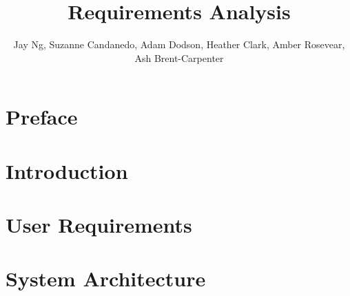 \documentclass[]{IEEEtran}
\title{Requirements Analysis}
\author{Jay Ng, Suzanne Candanedo, Adam Dodson, Heather Clark, Amber Rosevear, Ash Brent-Carpenter}
\begin{document}
	\maketitle
	
	\begin{comment}
		Each team is required to provide a Requirements Analysis Report. This will document your teams understanding of the specification, and will raise any questions that you may have. As well as addressing the specification itself, the report should also document any decisions that have been made in terms of group management (i.e. how you have organized yourselves to meet the goals of this project, how often you will meet, how you will address decision making etc.) and what methods you intend using in the planning and design of your solution.
		
		The requirements analysis report is not a design document, but rather a means by which you can demonstrate your understanding of the project’s aims. Any queries that you have regarding the specification should be clearly stated in this report.
		
		This part of your first deliverable must not exceed four sides of A4. Any appendices or other attachments will be removed.
	\end{comment}

	\section{Preface}
	
	\section{Introduction}
	
	
	\section{User Requirements}

	\section{System Architecture}
	
\end{document}
